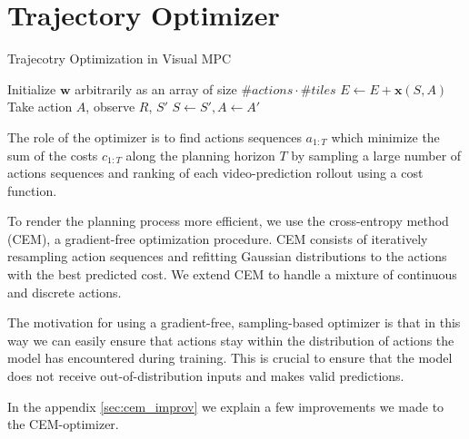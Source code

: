 \section{Trajectory Optimizer}

\begin{algorithm}[ht]
\caption{Trajecotry Optimization in Visual MPC}
\label{sarsalambdafa}
\begin{algorithmic}[1]
\State Initialize $\bm w$ arbitrarily as an array of size $\#actions \cdot \#tiles$
\State $E \leftarrow E + \bm x(S,A)$
\State Take action $A$, observe $R$, $S'$
\State $S \leftarrow S', A \leftarrow A'$
\EndWhile
\EndFor
\end{algorithmic}
\end{algorithm}



\label{sec:optimizer}
The role of the optimizer is to find actions sequences $a_{1:T}$ which minimize the sum of the costs $c_{1:T}$ along the planning horizon $T$ by sampling a large number of actions sequences and ranking of each video-prediction rollout using a cost function.

To render the planning process more efficient, we use the cross-entropy method (CEM), a gradient-free optimization procedure.
CEM consists of iteratively resampling action sequences and refitting Gaussian distributions to the actions with the best predicted cost. 
We extend CEM to handle a mixture of continuous and discrete actions.

The motivation for using a gradient-free, sampling-based optimizer is that in this way we can easily ensure that actions stay within the distribution of actions the model has encountered during training. This is crucial to ensure that the model does not receive out-of-distribution inputs and makes valid predictions. 

In the appendix \ref{sec:cem_improv} we explain a few improvements we made to the CEM-optimizer.